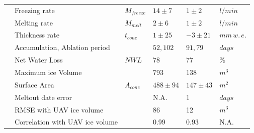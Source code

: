 \documentclass[utf8]{frontiersSCNS}
\begin{document}
\begin{table}
\begin{tabular}{@{}|llllll|@{}}
		                       & Freezing rate                   & $M_{freeze}$    & $14 \pm 7$    & $1 \pm 2$     & $l/min$     \\
		\multicolumn{1}{|l|}{} & Melting rate                    & $M_{melt}$      & $2 \pm 6$     & $1 \pm 2$     & $l/min$     \\
		\multicolumn{1}{|l|}{} & Thickness rate                  & $t_{cone}$      & $1 \pm 25$    & $-3 \pm 21$   &
		$mm \, w.\,e.$                                                                                                           \\
		\multicolumn{1}{|l|}{} & Accumulation, Ablation period   &                 & $52, 102$     & $91,79$       & $days$      \\
		\multicolumn{1}{|l|}{} & Net Water Loss                  & $NWL$           & 78            & 77
		                       & \%                                                                                              \\
		\multicolumn{1}{|l|}{} & Maximum ice Volume              &                 & 793           & 138           & $m^{3}$     \\
		\multicolumn{1}{|l|}{} & Surface Area                    & $A_{cone}$      & $488 \pm 94$  & $147 \pm 43$  & $m^{2}$     \\\midrule
		\multicolumn{1}{|l|}{\multirow{3}{*}{\rotatebox[origin=c]{90}{Model}}}
		                       & Meltout date error              &                 & N.A.          & 1             & $days$      \\
		\multicolumn{1}{|l|}{} & RMSE with UAV ice volume        &                 & 86            & 12            & $m^{3}$     \\
		\multicolumn{1}{|l|}{} & Correlation with UAV ice volume &                 & 0.99          & 0.93          &
		N.A.                                                                                                                     \\\bottomrule
	\end{tabular}
\end{table}
\end{document}
